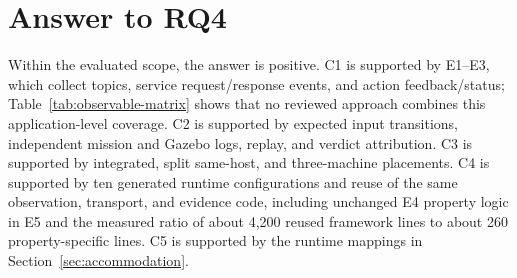 \section{Answer to RQ4}

Within the evaluated scope, the answer is positive. C1 is supported by E1--E3,
which collect topics, service request/response events, and action
feedback/status; Table~\ref{tab:observable-matrix} shows that no reviewed
approach combines this application-level coverage. C2 is supported by expected input transitions, independent
mission and Gazebo logs, replay, and verdict attribution. C3 is supported by
integrated, split same-host, and three-machine placements. C4 is supported by
ten generated runtime configurations and reuse of the same observation,
transport, and evidence code, including unchanged E4 property logic in E5 and
the measured ratio of about 4{,}200 reused framework lines to about 260
property-specific lines. C5 is supported by the runtime mappings in
Section~\ref{sec:accommodation}.
